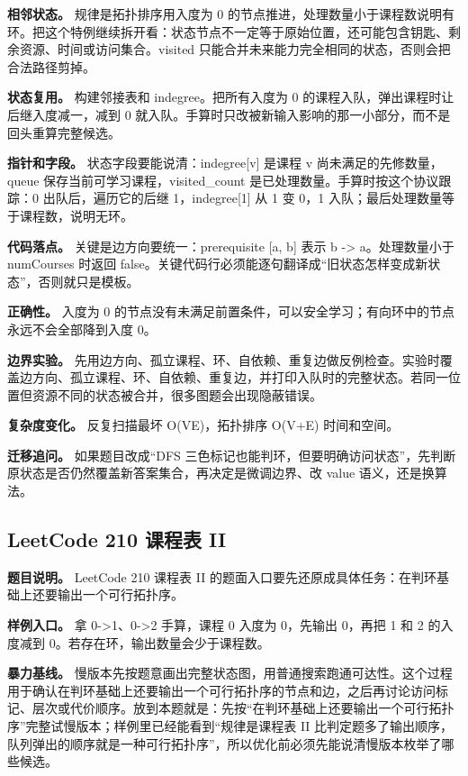 \textbf{相邻状态。} 规律是拓扑排序用入度为 0 的节点推进，处理数量小于课程数说明有环。把这个特例继续拆开看：状态节点不一定等于原始位置，还可能包含钥匙、剩余资源、时间或访问集合。visited 只能合并未来能力完全相同的状态，否则会把合法路径剪掉。

\textbf{状态复用。} 构建邻接表和 indegree。把所有入度为 0 的课程入队，弹出课程时让后继入度减一，减到 0 就入队。手算时只改被新输入影响的那一小部分，而不是回头重算完整候选。

\textbf{指针和字段。} 状态字段要能说清：indegree[v] 是课程 v 尚未满足的先修数量，queue 保存当前可学习课程，visited\_count 是已处理数量。手算时按这个协议跟踪：0 出队后，遍历它的后继 1，indegree[1] 从 1 变 0，1 入队；最后处理数量等于课程数，说明无环。

\textbf{代码落点。} 关键是边方向要统一：prerequisite [a, b] 表示 b -> a。处理数量小于 numCourses 时返回 false。关键代码行必须能逐句翻译成“旧状态怎样变成新状态”，否则就只是模板。

\textbf{正确性。} 入度为 0 的节点没有未满足前置条件，可以安全学习；有向环中的节点永远不会全部降到入度 0。

\textbf{边界实验。} 先用边方向、孤立课程、环、自依赖、重复边做反例检查。实验时覆盖边方向、孤立课程、环、自依赖、重复边，并打印入队时的完整状态。若同一位置但资源不同的状态被合并，很多图题会出现隐蔽错误。

\textbf{复杂度变化。} 反复扫描最坏 O(VE)，拓扑排序 O(V+E) 时间和空间。

\textbf{迁移追问。} 如果题目改成“DFS 三色标记也能判环，但要明确访问状态”，先判断原状态是否仍然覆盖新答案集合，再决定是微调边界、改 value 语义，还是换算法。

\subsection{LeetCode 210 课程表 II}

\textbf{题目说明。} LeetCode 210 课程表 II 的题面入口要先还原成具体任务：在判环基础上还要输出一个可行拓扑序。

\textbf{样例入口。} 拿 0->1、0->2 手算，课程 0 入度为 0，先输出 0，再把 1 和 2 的入度减到 0。若存在环，输出数量会少于课程数。

\textbf{暴力基线。} 慢版本先按题意画出完整状态图，用普通搜索跑通可达性。这个过程用于确认在判环基础上还要输出一个可行拓扑序的节点和边，之后再讨论访问标记、层次或代价顺序。放到本题就是：先按“在判环基础上还要输出一个可行拓扑序”完整试慢版本；样例里已经能看到“规律是课程表 II 比判定题多了输出顺序，队列弹出的顺序就是一种可行拓扑序”，所以优化前必须先能说清慢版本枚举了哪些候选。

